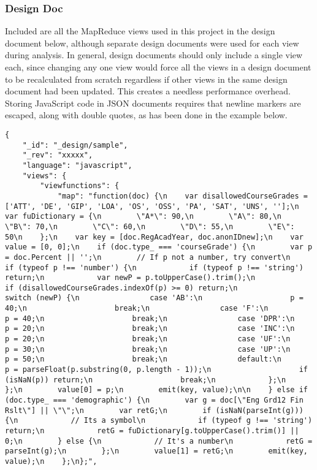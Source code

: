 \subsubsection{Design Doc}
\label{appendix:couchdb-design-doc}
Included are all the MapReduce views used in this project in the design document below, although separate design documents were used for each view during analysis. In general, design documents should only include a single view each, since changing any one view would force all the views in a design document to be recalculated from scratch regardless if other views in the same design document had been updated. This creates a needless performance overhead. Storing JavaScript code in JSON documents requires that newline markers are escaped, along with double quotes, as has been done in the example below.
\begin{verbatim}
{
    "_id": "_design/sample",
    "_rev": "xxxxx",
    "language": "javascript",
    "views": {
        "viewfunctions": {
            "map": "function(doc) {\n    var disallowedCourseGrades = ['ATT', 'DE', 'GIP', 'LOA', 'OS', 'OSS', 'PA', 'SAT', 'UNS', ''];\n    var fuDictionary = {\n        \"A*\": 90,\n        \"A\": 80,\n        \"B\": 70,\n        \"C\": 60,\n        \"D\": 55,\n        \"E\": 50\n    };\n    var key = [doc.RegAcadYear, doc.anonIDnew];\n    var value = [0, 0];\n    if (doc.type_ === 'courseGrade') {\n        var p = doc.Percent || '';\n        // If p not a number, try convert\n        if (typeof p !== 'number') {\n            if (typeof p !== 'string') return;\n            var newP = p.toUpperCase().trim();\n            if (disallowedCourseGrades.indexOf(p) >= 0) return;\n            switch (newP) {\n                case 'AB':\n                    p = 40;\n                    break;\n                case 'F':\n                    p = 40;\n                    break;\n                case 'DPR':\n                    p = 20;\n                    break;\n                case 'INC':\n                    p = 20;\n                    break;\n                case 'UF':\n                    p = 30;\n                    break;\n                case 'UP':\n                    p = 50;\n                    break;\n                default:\n                    p = parseFloat(p.substring(0, p.length - 1));\n                    if (isNaN(p)) return;\n                    break;\n            };\n        };\n        value[0] = p;\n        emit(key, value);\n\n    } else if (doc.type_ === 'demographic') {\n        var g = doc[\"Eng Grd12 Fin Rslt\"] || \"\";\n        var retG;\n        if (isNaN(parseInt(g))) {\n            // Its a symbol\n            if (typeof g !== 'string') return;\n            retG = fuDictionary[g.toUpperCase().trim()] || 0;\n        } else {\n            // It's a number\n            retG = parseInt(g);\n        };\n        value[1] = retG;\n        emit(key, value);\n    };\n};",

\end{verbatim}

